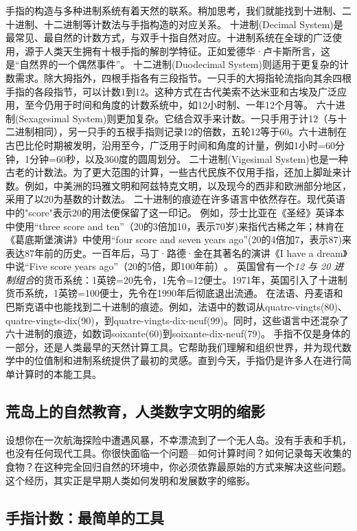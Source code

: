 手指的构造与多种进制系统有着天然的联系。稍加思考，我们就能找到十进制、二十进制、十二进制等计数法与手指构造的对应关系。
十进制(Decimal System)是最常见、最自然的计数方式，与双手十指自然对应。十进制系统在全球的广泛使用，源于人类天生拥有十根手指的解剖学特征。正如爱德华·卢卡斯所言，这是“自然界的一个偶然事件”​。
十二进制(Duodecimal System)则适用于更复杂的计数需求。除大拇指外，四根手指各有三段指节。一只手的大拇指轮流指向其余四根手指的各段指节，可以计数1到12。这种方式在古代美索不达米亚和古埃及广泛应用，至今仍用于时间和角度的计数系统中，如12小时制、一年12个月等。
六十进制(Sexagesimal System)则更加复杂。它结合双手来计数。一只手用于计12（与十二进制相同），另一只手的五根手指则记录12的倍数，五轮12等于60。六十进制在古巴比伦时期被发明，沿用至今，广泛用于时间和角度的计量，例如1小时=60分钟，1分钟=60秒，以及360度的圆周划分。
二十进制(Vigesimal System)也是一种古老的计数法。为了更大范围的计算，一些古代民族不仅用手指，还加上脚趾来计数。例如，中美洲的玛雅文明和阿兹特克文明，以及现今的西非和欧洲部分地区，采用了以20为基数的计数法。
二十进制的痕迹在许多语言中依然存在。现代英语中的"score"表示20的用法便保留了这一印记。
例如，莎士比亚在《圣经》英译本中使用“three score and ten”（20的3倍加10，表示70岁)来指代古稀之年；林肯在《葛底斯堡演讲》中使用“four score and seven years ago”(20的4倍加7，表示87)来表达87年前的历史。一百年后，马丁·路德·金在其著名的演讲《I have a dream》中说“Five score years ago”​（20的5倍，即100年前）​。
英国曾有一个\emph{12 与 20 进制组合}的货币系统：1英镑=20先令，1先令=12便士。1971年，英国引入了十进制货币系统，1英镑=100便士，先令在1990年后彻底退出流通。
在法语、丹麦语和巴斯克语中也能找到二十进制的痕迹。例如，法语中的数词从quatre-vingts(80)​、quatre-vingts-dix(90)​，到quatre-vingts-dix-neuf(99)。同时，这些语言中还混杂了六十进制的痕迹，如数词soixante(60)到soixante-dix-neuf(79)。
手指不仅是身体的一部分，还是人类最早的天然计算工具。它帮助我们理解和组织世界，并为现代数学中的位值制和进制系统提供了最初的灵感。直到今天，手指仍是许多人在进行简单计算时的本能工具。


\subsection{荒岛上的自然教育，人类数字文明的缩影}
设想你在一次航海探险中遭遇风暴，不幸漂流到了一个无人岛。没有手表和手机，也没有任何现代工具。你很快面临一个问题---如何计算时间？如何记录每天收集的食物？在这种完全回归自然的环境中，你必须依靠最原始的方式来解决这些问题。这个经历，其实正是早期人类如何发明和发展数字的缩影。

\subsection{手指计数：最简单的工具}

